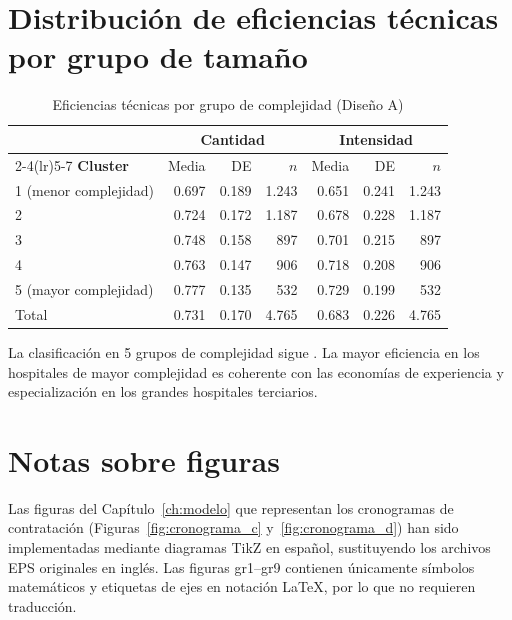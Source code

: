 \documentclass[12pt, a4paper, twoside, openright]{book}
\theoremstyle{plain}
\theoremstyle{definition}
\theoremstyle{remark}
\begin{document}
\section{Distribución de eficiencias técnicas por grupo de tamaño}

\begin{table}[htbp]
\centering
\caption{Eficiencias técnicas por grupo de complejidad (Diseño A)}
\label{tab:te_cluster}
\begin{threeparttable}
\small
\begin{tabular}{lrrrrrr}
\toprule
& \multicolumn{3}{c}{\textbf{Cantidad}} & \multicolumn{3}{c}{\textbf{Intensidad}} \\
\cmidrule(lr){2-4}\cmidrule(lr){5-7}
\textbf{Cluster} & Media & DE & $n$ & Media & DE & $n$ \\
\midrule
1 (menor complejidad) & 0.697 & 0.189 & 1.243 & 0.651 & 0.241 & 1.243 \\
2                     & 0.724 & 0.172 & 1.187 & 0.678 & 0.228 & 1.187 \\
3                     & 0.748 & 0.158 & 897   & 0.701 & 0.215 & 897   \\
4                     & 0.763 & 0.147 & 906   & 0.718 & 0.208 & 906   \\
5 (mayor complejidad) & 0.777 & 0.135 & 532   & 0.729 & 0.199 & 532   \\
\midrule
Total                 & 0.731 & 0.170 & 4.765 & 0.683 & 0.226 & 4.765 \\
\bottomrule
\end{tabular}
\begin{tablenotes}
  \small
  \item La clasificación en 5 grupos de complejidad sigue \citet{ministerio2007}. La mayor eficiencia en los hospitales de mayor complejidad es coherente con las economías de experiencia y especialización en los grandes hospitales terciarios.
\end{tablenotes}
\end{threeparttable}
\end{table}

\section{Notas sobre figuras}

Las figuras del Capítulo~\ref{ch:modelo} que representan los cronogramas de contratación (Figuras~\ref{fig:cronograma_c} y~\ref{fig:cronograma_d}) han sido implementadas mediante diagramas TikZ en español, sustituyendo los archivos EPS originales en inglés. Las figuras gr1--gr9 contienen únicamente símbolos matemáticos y etiquetas de ejes en notación LaTeX, por lo que no requieren traducción.


\backmatter


\end{document}

